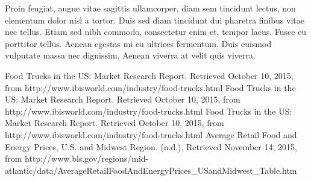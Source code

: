 \documentclass[12pt, letterpaper]{article}
\begin{document}
Proin feugiat, augue vitae sagittis ullamcorper, diam sem tincidunt lectus, non elementum dolor nisl a tortor. Duis sed diam tincidunt dui pharetra finibus vitae nec tellus. Etiam sed nibh commodo, consectetur enim et, tempor lacus. Fusce eu porttitor tellus. Aenean egestas mi eu ultrices fermentum. Duis euismod vulputate massa nec dignissim. Aenean viverra at velit quis viverra.

\newpage

\begin{thebibliography}{9}

        Food Trucks in the US: Market Research Report. Retrieved October 10, 2015, from http://www.ibisworld.com/industry/food-trucks.html
        Food Trucks in the US: Market Research Report. Retrieved October 10, 2015, from http://www.ibisworld.com/industry/food-trucks.html        
        Food Trucks in the US: Market Research Report. Retrieved October 10, 2015, from http://www.ibisworld.com/industry/food-trucks.html
        Average Retail Food and Energy Prices, U.S. and Midwest Region. (n.d.). Retrieved November 14, 2015, from http://www.bls.gov/regions/mid-atlantic/data/AverageRetailFoodAndEnergyPrices\_USandMidwest\_Table.htm

\end{thebibliography}

\newpage

\end{document}
